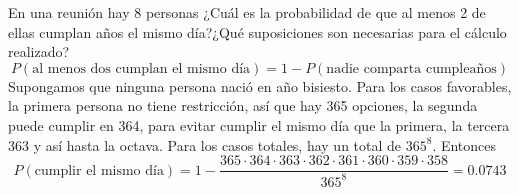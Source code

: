 \item En una reunión hay 8 personas ¿Cuál es la probabilidad de que al menos 2 de ellas cumplan años el mismo día?¿Qué suposiciones son necesarias para el cálculo realizado?
    \[P(\text{al menos dos cumplan el mismo día})=1-P(\text{nadie comparta cumpleaños})\]
    Supongamos que ninguna persona nació en año bisiesto. Para los casos favorables, la primera persona no tiene restricción, así que hay 365 opciones, la segunda puede cumplir en 364, para evitar cumplir el mismo día que la primera, la tercera 363 y así hasta la octava. Para los casos totales, hay un total de $365^8$. Entonces\[P(\text{cumplir el mismo día})=1-\frac{365\cdot364\cdot363\cdot362\cdot361\cdot360\cdot359\cdot358}{365^8}=0.0743\]